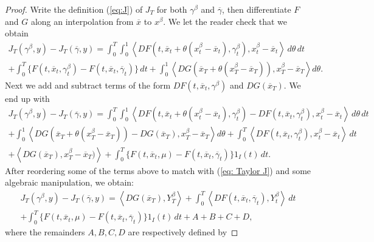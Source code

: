 \documentclass[12pt,reqno]{amsart}
\numberwithin{equation}{section}  %
\newcommand{\1}{{\bf 1}}
\newcommand{\2}{{\bf 2}}
\newcommand{\ga}{\gamma}
\theoremstyle{remark}
\theoremstyle{remark}
\begin{document}
\begin{proof} 
Write the definition (\ref{eq:J}) of $J_{T}$ for both $\ga^{\beta}$ and $\overline{\ga}$, then differentiate $F$ and $G$ along an interpolation from $\overline{x}$ to $x^{\beta}$. We let the reader check that we obtain
    \begin{multline}
       J_{T}(\gamma^{\beta},y)-J_{T}(\overline{\gamma},y)=\int_{0}^{T}\int_{0}^{1}\left<DF(t,\overline{x}_{t}+\theta (x^{\beta}_{t}-\overline{x}_{t}),\gamma^{\beta}_{t}),x^{\beta}_{t}-\overline{x}_{t} \right>\, d\theta \,dt \\
       +\int_{0}^{T}\{F(t,\overline{x}_{t},\gamma_{t}^{\beta})-F(t,\overline{x}_{t},\overline{\gamma}_{t})\}\, dt 
+\int_{0}^{1}\left<DG(\overline{x}_{T}+\theta (x^{\beta}_{T}-\overline{x}_{T})), x_{T }^{\beta}-\overline{x}_{T} \right>d\theta.
\end{multline}
Next we add and subtract terms of the form $DF(t,\overline{x}_{t},\ga^{\beta})$ and $DG(\overline{x}_{T})$. We end up with
\begin{multline*}
     J_{T}(\ga^{\beta},y)-J_{T}(\overline{\ga},y)  = \int_{0}^{T}\int_{0}^{1}\left<DF(t,\overline{x}_{t}+\theta (x^{\beta}_{t}-\overline{x}_{t}),\gamma^{\beta}_{t})-DF(t,\overline{x}_{t},\gamma^{\beta}_{t}),x^{\beta}_{t}-\overline{x}_{t} \right>\, d\theta \,dt \\
    +\int_{0}^{1}\left< DG(\overline{x}_{T}
       +\theta (x^{\beta}_{T}-\overline{x}_{T}))-DG(\overline{x}_{T}),x^{\beta}_{T}-\overline{x}_{T} \right> d\theta
+\int_{0}^{T}\left<DF(t,\overline{x}_{t},\gamma^{\beta}_{t}),x^{\beta}_{t}-\overline{x}_{t} \right>\, dt \\
       + \left<DG(\overline{x}_{T}),x^{\beta}_{T}-\overline{x}_{T}) \right>+\int_{0}^{T}\{F(t,\overline{x}_{t},\mu)-F(t,\overline{x}_{t},\overline{\gamma}_{t})\}1_{I}(t)\,dt .
       \end{multline*}
      After reordering some of the terms above to match with (\ref{eq: Taylor J}) and some algebraic manipulation, we obtain:
   \begin{multline}\label{eq: TaylorJ1}
J_{T}(\ga^{\beta},y)-J_{T}(\overline{\ga},y)=\left<DG(\overline{x}_{T}),Y^{\beta}_{T}\right> +\int_{0}^{T}\left<DF(t,\overline{x}_{t},\overline{\gamma}_{t}),Y_{t}^{\beta}
        \right>\,dt\\ 
        + \int_{0}^{T}\{F(t,\overline{x}_{t},\mu)-F(t,\overline{x}_{t},\overline{\gamma}_{t})\}1_{I}(t)\,dt+ A+B+C+D, 
   \end{multline}
   where the remainders $A,B,C,D$ are respectively defined by

\end{proof}
\end{document}
